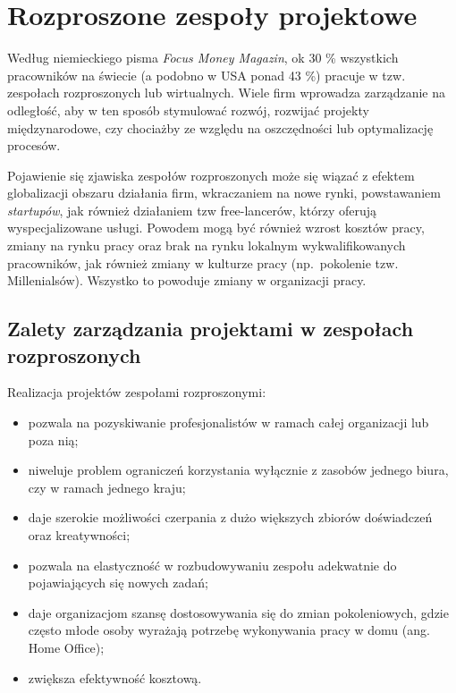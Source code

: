 ﻿%

\chapter{Rozproszone zespoły projektowe}

Według niemieckiego pisma \textit{Focus Money Magazin},
ok 30 \% wszystkich pracowników na świecie (a podobno w USA ponad 43 \%) pracuje w tzw.
zespołach rozproszonych lub wirtualnych.
Wiele firm wprowadza zarządzanie na odległość, aby w ten sposób stymulować rozwój,
rozwijać projekty międzynarodowe, czy chociażby ze względu na oszczędności lub optymalizację procesów.

Pojawienie się zjawiska zespołów rozproszonych może się wiązać z efektem globalizacji obszaru działania firm,
wkraczaniem na nowe rynki, powstawaniem \textit{startupów}, jak również działaniem tzw free-lancerów,
którzy oferują wyspecjalizowane usługi.
Powodem mogą być również wzrost kosztów pracy, zmiany na rynku pracy oraz brak na rynku lokalnym
wykwalifikowanych pracowników, jak również zmiany w kulturze pracy
(np.\ pokolenie tzw. Millenialsów). Wszystko to powoduje zmiany w organizacji pracy.

\section{Zalety zarządzania projektami w zespołach rozproszonych}

Realizacja projektów zespołami rozproszonymi:

\begin{itemize}
	\item pozwala na pozyskiwanie profesjonalistów w ramach całej organizacji lub poza nią;
	\item niweluje problem ograniczeń korzystania wyłącznie z zasobów jednego biura, czy w ramach jednego kraju;
	\item daje szerokie możliwości czerpania z dużo większych zbiorów doświadczeń oraz kreatywności;
	\item pozwala na elastyczność w rozbudowywaniu zespołu adekwatnie do pojawiających się nowych zadań;
	\item daje organizacjom szansę dostosowywania się do zmian pokoleniowych,
	gdzie często młode osoby wyrażają potrzebę wykonywania pracy w domu (ang. Home Office);
	\item zwiększa efektywność kosztową.
\end{itemize}

